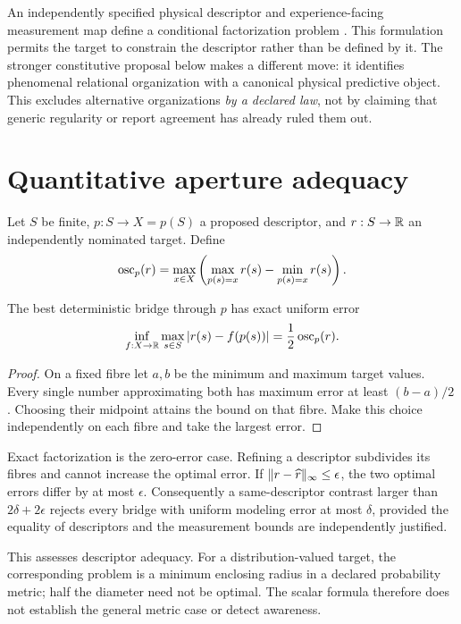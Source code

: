 An independently specified physical descriptor and experience-facing measurement map define a conditional factorization problem \cite{RodgersField}. This formulation permits the target to constrain the descriptor rather than be defined by it. The stronger constitutive proposal below makes a different move: it identifies phenomenal relational organization with a canonical physical predictive object. This excludes alternative organizations \emph{by a declared law}, not by claiming that generic regularity or report agreement has already ruled them out.

\section{Quantitative aperture adequacy}\label{section:underdetermination:quantitative-aperture-adequacy}
Let $S$ be finite, $p:S\to X=p(S)$ a proposed descriptor, and $r:S\to\mathbb R$ an independently nominated target. Define
\[
\operatorname{osc}_p(r)=\max_{x\in X}\left(\max_{p(s)=x}r(s)-\min_{p(s)=x}r(s)\right).
\]
\begin{theorem}\label{thm:aperture}
The best deterministic bridge through $p$ has exact uniform error
\begin{equation}\label{eq:aperture}
\inf_{f:X\to\mathbb R}\max_{s\in S}|r(s)-f(p(s))|
=\frac12\operatorname{osc}_p(r).
\end{equation}
\end{theorem}
\begin{proof}
On a fixed fibre let $a,b$ be the minimum and maximum target values. Every single number approximating both has maximum error at least $(b-a)/2$. Choosing their midpoint attains the bound on that fibre. Make this choice independently on each fibre and take the largest error.
\end{proof}

Exact factorization is the zero-error case. Refining a descriptor subdivides its fibres and cannot increase the optimal error. If $\lVert r-\widehat r\rVert_\infty\le\epsilon$, the two optimal errors differ by at most $\epsilon$. Consequently a same-descriptor contrast larger than $2\delta+2\epsilon$ rejects every bridge with uniform modeling error at most $\delta$, provided the equality of descriptors and the measurement bounds are independently justified.

This assesses descriptor adequacy. For a distribution-valued target, the corresponding problem is a minimum enclosing radius in a declared probability metric; half the diameter need not be optimal. The scalar formula therefore does not establish the general metric case or detect awareness.

